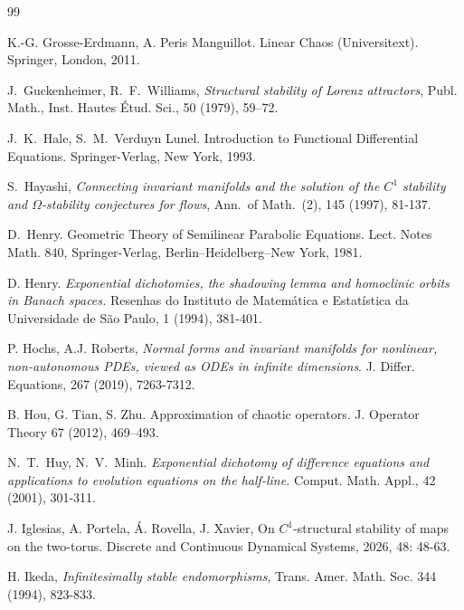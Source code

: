 \documentclass[12pt]{article}
\theoremstyle{definition}
\begin{document}
\begin{thebibliography}{99}
{
K.-G. Grosse-Erdmann, A. Peris Manguillot. Linear Chaos (Universitext). Springer, London, 2011.

J.~Guckenheimer, R.~F.~Williams,
\emph{Structural stability of Lorenz attractors},
Publ. Math., Inst. Hautes Étud. Sci., 50 (1979), 59--72.

J.~K.~Hale, S.~M.\ Verduyn Lunel.
\newblock Introduction to Functional Differential Equations.
\newblock Springer-Verlag, New York, 1993.

S.~Hayashi, \emph{Connecting invariant manifolds and the solution of the $C^1$ stability and $\Omega$-stability conjectures for flows}, Ann.~of Math.~(2), 145 (1997), 81-137. %

D.~Henry.
\newblock Geometric Theory of Semilinear Parabolic Equations.
\newblock Lect. Notes Math. 840, Springer-Verlag, Berlin--Heidelberg--New York, 1981.


 D. Henry. \textit{Exponential dichotomies, the shadowing lemma and homoclinic orbits in Banach spaces.} Resenhas do Instituto de Matemática e Estatística da Universidade de São Paulo, 1 (1994), 381-401.


P. Hochs, A.J. Roberts,
\textit{Normal forms and invariant manifolds for nonlinear, non-autonomous PDEs, viewed as ODEs in infinite dimensions}. J. Differ. Equations, 267 (2019), 7263-7312.

B. Hou, G. Tian, S. Zhu. Approximation of chaotic operators. J. Operator Theory 67 (2012), 469–493.

N.~T.~Huy, N.~V.~Minh.
\newblock \textit{Exponential dichotomy of difference equations and applications to evolution equations on the half-line.}
\newblock Comput. Math. Appl., 42 (2001), 301-311.

J. Iglesias, A. Portela, Á. Rovella, J. Xavier, On $C^1$-structural stability of maps on the two-torus. Discrete and Continuous Dynamical Systems, 2026, 48: 48-63.

H. Ikeda,
\textit{Infinitesimally stable endomorphisms},
Trans. Amer. Math. Soc. 344 (1994), 823-833.


}
\end{thebibliography}
\end{document}

